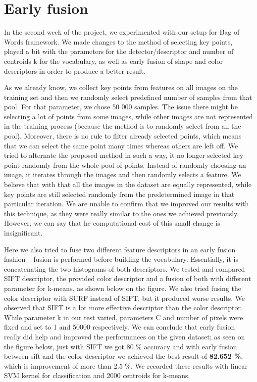 \documentclass[11pt,a4paper,titlepage,twoside]{scrartcl}
\begin{document}

\section*{Early fusion}

\indent	In the second week of the project, we experimented with our setup for Bag of Words framework. We made changes to the method of selecting key points, played a bit with the parameters for the detector/descriptor and number of centroids k for the vocabulary, as well as early fusion of shape and color descriptors in order to produce a better result.
\par	As we already know, we collect key points from features on all images on the training set and then we randomly select predefined number of samples from that pool. For that parameter, we chose 50 000 samples. The issue there might be selecting a lot of points from some images, while other images are not represented in the training process (because the method is to randomly select from all the pool). Moreover, there is no rule to filter already selected points, which means that we can select the same point many times whereas others are left off. We tried to alternate the proposed method in such a way, it no longer selected key point randomly from the whole pool of points. Instead of randomly choosing an image, it iterates through the images and then randomly selects a feature. We believe that with that all the images in the dataset are equally represented, while key points are still selected randomly from the predetermined image in that particular iteration. We are unable to confirm that we improved our results with this technique, as they were really similar to the ones we achieved previously. However, we can say that he computational cost of this small change is insignificant.
\par	Here we also tried to fuse two different feature descriptors in an early fusion fashion – fusion is performed before building the vocabulary. Essentially, it is concatenating the two histograms of both descriptors. We tested  and compared SIFT descriptor, the provided color descriptor and a fusion of both with different parameter for k-means, as shown below on the figure. We also tried fusing the color descriptor with SURF instead of SIFT, but it produced worse results. We observed that SIFT is a lot more effective descriptor than the color descriptor. While parameter k in our test varied, parameters C and number of pixels were fixed and set to 1 and 50000 respectively. We can conclude that early fusion really did help and improved the performances on the given dataset; as seen on the figure below, just with SIFT we got 80 \% accuracy and with early fusion between sift and the color descriptor we achieved the best result of \textbf{82.652 \%}, which is improvement of more than 2.5 \%. We recorded these results with linear SVM kernel for classification and 2000 centroids for k-means. 
\end{document}
